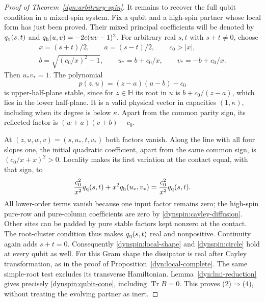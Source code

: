 \documentclass[reqno]{amsart}
\theoremstyle{definition}
\theoremstyle{remark}
\newcommand{\HH}{\mathbb H}
\DeclareMathOperator{\Tr}{Tr}
\begin{document}
\begin{proof}[Proof of Theorem~\ref{dyn:arbitrary-spin}]
It remains to recover the full qubit condition in a mixed-spin system.
Fix a qubit and a high-spin partner whose local form has just been
proved.  Their mixed principal coefficients will be denoted by
$q_{\rm q}(s,t)$ and $q_{\rm h}(u,v)=-2c(uv-1)^2$.
For arbitrary real $s,t$ with $s+t\ne0$, choose
\begin{equation}\label{dynspin:mask-parameters}
 \begin{gathered}
 x=(s+t)/2,\qquad a=(s-t)/2,\qquad c_0>|x|,\\
 b=\sqrt{(c_0/x)^2-1},\qquad
 u_*=b+c_0/x,\qquad v_*=-b+c_0/x.
 \end{gathered}
\end{equation}
Then $u_*v_*=1$.  The polynomial
\begin{equation}\label{dynspin:mixed-test}
 p(z,u)=(z-a)(u-b)-c_0
\end{equation}
is upper-half-plane stable, since for $z\in\HH$ its root in $u$ is
$b+c_0/(z-a)$, which lies in the lower half-plane.
It is a valid physical vector in capacities $(1,\kappa)$, including
when its degree is below $\kappa$.  Apart from the common parity sign,
its reflected factor is $(w+a)(v+b)-c_0$.

At $(z,u,w,v)=(s,u_*,t,v_*)$ both factors vanish.  Along the line with
all four slopes one, the initial quadratic coefficient, apart from
the same common sign, is $(c_0/x+x)^2>0$.  Locality makes its first
variation at the contact equal, with that sign, to
\begin{equation}\label{dynspin:mask-isolation}
 \frac{c_0^2}{x^2}q_{\rm q}(s,t)
       +x^2q_{\rm h}(u_*,v_*)
 =\frac{c_0^2}{x^2}q_{\rm q}(s,t).
\end{equation}
All lower-order terms vanish because one input factor remains zero;
the high-spin pure-row and pure-column coefficients are zero by
\eqref{dynspin:cayley-diffusion}.  Other sites can be padded by pure
stable factors kept nonzero at the contact.  The root-cluster condition
thus makes $q_{\rm q}(s,t)$ real and nonpositive.  Continuity again adds
$s+t=0$.  Consequently \eqref{dynspin:local-shape} and
\eqref{dynspin:circle} hold at every qubit as well.  For this Gram shape
the dissipator is real after Cayley transformation, as in the proof of
Proposition~\ref{dyn:local-complete}.  The same simple-root test excludes
its transverse Hamiltonian.  Lemma~\ref{dyn:lmi-reduction} gives precisely
\eqref{dynspin:qubit-cone}, including $\Tr B=0$.  This proves
(2)$\Rightarrow$(4), without treating the evolving partner as inert.


\end{proof}
\end{document}
